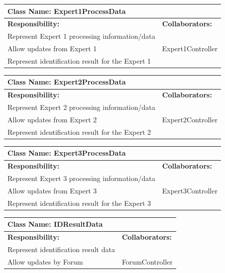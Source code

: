 \documentclass[]{article}
\begin{document}
	\begin{table}[ht]
		\centering
		\begin{tabular}{|p{5cm}|p{5cm}|}
		\hline 
		 \multicolumn{2}{|l|}{\textbf{Class Name: Expert1ProcessData}} \\
		\hline
		\textbf{Responsibility:} & \textbf{Collaborators:} \\
		\hline
		Represent Expert 1 processing information/data &  \\
		\hline
		Allow updates from Expert 1 & Expert1Controller \\
		\hline
		Represent identification result for the Expert 1 &  \\
		\hline
		\end{tabular}
	\end{table}
	
\newpage
	\begin{table}[ht]
		\centering
		\begin{tabular}{|p{5cm}|p{5cm}|}
		\hline 
		 \multicolumn{2}{|l|}{\textbf{Class Name: Expert2ProcessData}} \\
		\hline
		\textbf{Responsibility:} & \textbf{Collaborators:} \\
		\hline
		Represent Expert 2 processing information/data &  \\
		\hline
		Allow updates from Expert 2 & Expert2Controller \\
		\hline
		Represent identification result for the Expert 2 &  \\
		\hline
		\end{tabular}
	\end{table}
	
	\begin{table}[ht]
		\centering
		\begin{tabular}{|p{5cm}|p{5cm}|}
		\hline 
		 \multicolumn{2}{|l|}{\textbf{Class Name: Expert3ProcessData}} \\
		\hline
		\textbf{Responsibility:} & \textbf{Collaborators:} \\
		\hline
		Represent Expert 3 processing information/data &  \\
		\hline
		Allow updates from Expert 3 & Expert3Controller \\
		\hline
		Represent identification result for the Expert 3 &  \\
		\hline
		\end{tabular}
	\end{table}
	
	\begin{table}[ht]
		\centering
		\begin{tabular}{|p{5cm}|p{5cm}|}
		\hline 
		 \multicolumn{2}{|l|}{\textbf{Class Name: IDResultData}} \\
		\hline
		\textbf{Responsibility:} & \textbf{Collaborators:} \\
		\hline
		Represent identification result data &  \\
		\hline
		Allow updates by Forum &  ForumController \\
		\hline
		\end{tabular}
	\end{table}
	
\end{document}
